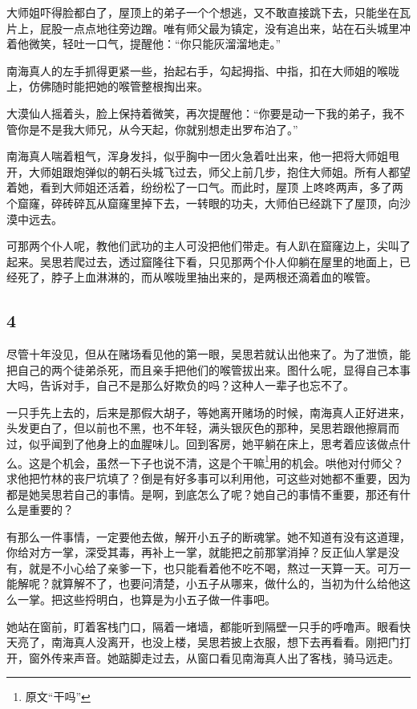 大师姐吓得脸都白了，屋顶上的弟子一个个想逃，又不敢直接跳下去，只能坐在瓦片上，屁股一点点地往旁边蹭。唯有师父最为镇定，没有追出来，站在石头城里冲着他微笑，轻吐一口气，提醒他：“你只能灰溜溜地走。”

南海真人的左手抓得更紧一些，抬起右手，勾起拇指、中指，扣在大师姐的喉咙上，仿佛随时能把她的喉管整根掏出来。

大漠仙人摇着头，脸上保持着微笑，再次提醒他：“你要是动一下我的弟子，我不管你是不是我大师兄，从今天起，你就别想走出罗布泊了。”

南海真人喘着粗气，浑身发抖，似乎胸中一团火急着吐出来，他一把将大师姐甩开，大师姐跟炮弹似的朝石头城飞过去，师父上前几步，抱住大师姐。所有人都望着她，看到大师姐还活着，纷纷松了一口气。而此时，屋顶
上咚咚两声，多了两个窟窿，碎砖碎瓦从窟窿里掉下去，一转眼的功夫，大师伯已经跳下了屋顶，向沙漠中远去。

可那两个仆人呢，教他们武功的主人可没把他们带走。有人趴在窟窿边上，尖叫了起来。吴思若爬过去，透过窟隆往下看，只见那两个仆人仰躺在屋里的地面上，已经死了，脖子上血淋淋的，而从喉咙里抽出来的，是两根还滴着血的喉管。
\newline

{\centering\subsection{4}}

尽管十年没见，但从在赌场看见他的第一眼，吴思若就认出他来了。为了泄愤，能把自己的两个徒弟杀死，而且亲手把他们的喉管拔出来。图什么呢，显得自己本事大吗，告诉对手，自己不是那么好欺负的吗？这种人一辈子也忘不了。

一只手先上去的，后来是那假大胡子，等她离开赌场的时候，南海真人正好进来，头发更白了，但以前也不黑，也不年轻，满头银灰色的那种，吴思若跟他擦肩而过，似乎闻到了他身上的血腥味儿。回到客房，她平躺在床上，思考着应该做点什么。这是个机会，虽然一下子也说不清，这是个干嘛\footnote{原文“干吗”}用的机会。哄他对付师父？求他把竹林的丧尸坑填了？倒是有好多事可以利用他，可这些对她都不重要，因为都是她吴思若自己的事情。是啊，到底怎么了呢？她自己的事情不重要，那还有什么是重要的？

有那么一件事情，一定要他去做，解开小五子的断魂掌。她不知道有没有这道理，你给对方一掌，深受其毒，再补上一掌，就能把之前那掌消掉？反正仙人掌是没有，就是不小心给了亲爹一下，也只能看着他不吃不喝，熬过一天算一天。可万一能解呢？就算解不了，也要问清楚，小五子从哪来，做什么的，当初为什么给他这么一掌。把这些捋明白，也算是为小五子做一件事吧。

她站在窗前，盯着客栈门口，隔着一堵墙，都能听到隔壁一只手的呼噜声。眼看快天亮了，南海真人没离开，也没上楼，吴思若披上衣服，想下去再看看。刚把门打开，窗外传来声音。她踮脚走过去，从窗口看见南海真人出了客栈，骑马远走。

